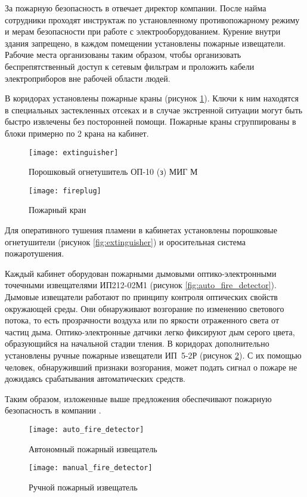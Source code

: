 За пожарную безопасность в \yandexbel{} отвечает директор компании. После найма сотрудники проходят инструктаж по установленному противопожарному режиму и мерам безопасности при работе с электрооборудованием. Курение внутри здания запрещено, в каждом помещении установлены пожарные извещатели. Рабочие места организованы таким образом, чтобы организовать беспрепятственный доступ к сетевым фильтрам и проложить кабели электроприборов вне рабочей области людей.

В коридорах установлены пожарные краны (рисунок \ref{fig:fireplug}). Ключи к ним находятся в специальных застекленных отсеках и в случае экстренной ситуации могут быть быстро извлечены без посторонней помощи. Пожарные краны сгруппированы в блоки примерно по 2 крана на кабинет.

\begin{figure}[H]
  \begin{center}
    \texttt{[image: extinguisher]}
    \caption{Порошковый огнетушитель \mbox{ОП-10} (з) МИГ М}
    \label{fig:extinguisher}

    \vspace{0.05\textheight}

    \texttt{[image: fireplug]}
    \caption{Пожарный кран}
    \label{fig:fireplug}
  \end{center}
\end{figure}

Для оперативного тушения пламени в кабинетах установлены порошковые огнетушители (рисунок \ref{fig:extinguisher}) и оросительная система пожаротушения.

Каждый кабинет оборудован пожарными дымовыми оптико-электронными точечными извещателями \mbox{ИП212-02М1} (рисунок \ref{fig:auto_fire_detector}). Дымовые извещатели работают по принципу контроля оптических свойств окружающей среды. Они обнаруживают возгорание по изменению светового потока, то есть прозрачности воздуха или по яркости отраженного света от частиц дыма. Оптико-электронные датчики легко фиксируют дым серого цвета, образующийся на начальной стадии тления. В коридорах дополнительно установлены ручные пожарные извещатели \mbox{ИП 5-2Р} (рисунок \ref{fig:manual_fire_detector}). С их помощью человек, обнаруживший признаки возгорания, может подать сигнал о пожаре не дожидаясь срабатывания автоматических средств.

Таким образом, изложенные выше предложения обеспечивают пожарную безопасность в компании \yandexbel{}.

\begin{figure}
  \begin{center}
    \texttt{[image: auto\_fire\_detector]}
    \caption{Автономный пожарный извещатель}
    \label{fig:auto_fire_detector}

    \vspace{0.05\textheight}

    \texttt{[image: manual\_fire\_detector]}
    \caption{Ручной пожарный извещатель}
    \label{fig:manual_fire_detector}
  \end{center}
\end{figure}
